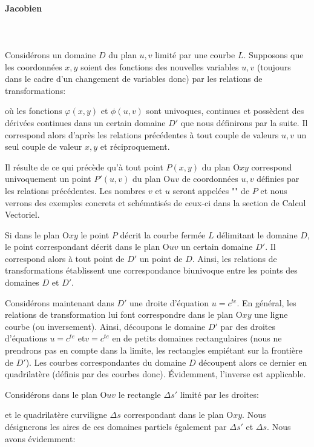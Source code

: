 	
	\pagebreak
	\paragraph{Jacobien}\label{jacobian}\mbox{}\\\\
	Considérons un domaine $D$ du plan $u,v$ limité par une courbe $L$. Supposons que les coordonnées $x, y$ soient des fonctions des nouvelles variables $u, v$ (toujours dans le cadre d'un changement de variables donc) par les relations de transformations:
	
	où les fonctions $\varphi (x,y)$ et $\phi(u,v)$ sont univoques, continues et possèdent des dérivées continues dans un certain domaine $D'$ que nous définirons par la suite. Il correspond alors d'après les relations précédentes à tout couple de valeurs $u, v$ un seul couple de valeur $x, y$ et réciproquement.
	
	Il résulte de ce qui précède qu'à tout point $P(x,y)$ du plan $\text{O}xy$ correspond univoquement un point $P '(u, v)$ du plan $\text{O}uv$ de coordonnées $u, v$ définies par les relations précédentes. Les nombres $v$ et $u$ seront appelées "\label{curvilinear coordinates}" de $P$ et nous verrons des exemples concrets et schématisés de ceux-ci dans la section de Calcul Vectoriel.
	
	Si dans le plan $\text{O}xy$ le point $P$ décrit la courbe fermée $L$ délimitant le domaine $D$, le point correspondant décrit dans le plan $\text{O}uv$ un certain domaine $D'$. Il correspond alors à tout point de $D'$ un point de $D$. Ainsi, les relations de transformations établissent une correspondance biunivoque entre les points des domaines $D$ et $D'$.
	
	Considérons maintenant dans $D'$ une droite d'équation $u=c^{te}$. En général, les relations de transformation lui font correspondre dans le plan $\text{O}xy$ une ligne courbe (ou inversement). Ainsi, découpons le domaine $D'$ par des droites d'équations $u=c^{te}$ et$v=c^{te}$  en de petits domaines rectangulaires (nous ne prendrons pas en compte dans la limite, les rectangles empiétant sur la frontière de $D'$). Les courbes correspondantes du domaine $D$ découpent alors ce dernier en quadrilatère (définis par des courbes donc). Évidemment, l'inverse est applicable.
	
	Considérons dans le plan $\text{O}uv$ le rectangle $\Delta s'$ limité par les droites:
	
	et le quadrilatère curviligne $\Delta s$ correspondant dans le plan $\text{O}xy$. Nous désignerons les aires de ces domaines partiels également par $\Delta s'$ et $\Delta s$. Nous avons évidemment:
	
